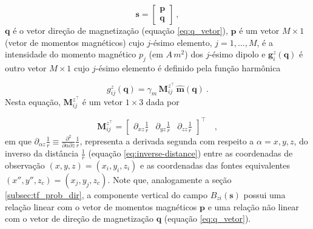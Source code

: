 \begin{equation}
      \mathbf{s} = \begin{bmatrix}
		\mathbf{p} \\
		\mathbf{q}
	\end{bmatrix} \: ,
	\label{eq:parameter-vector-z}
\end{equation}
$\mathbf{q}$ é o vetor direção de magnetização (equação \ref{eq:q_vetor}), $\mathbf{p}$ é um vetor $M \times 1$ (vetor de momentos magnéticos) cujo $j$-ésimo elemento, $j=1,\dots,M$, é a intensidade do momento magnético $p_{j}$ (em $A \, m^{2}$) dos $j$-ésimo dipolo e $\mathbf{g}_{i}^{z} (\mathbf{q})$ é outro vetor $M \times 1$ cujo $j$-ésimo elemento é definido pela função harmônica 

\begin{equation}
g_{ij}^{z}(\mathbf{q})  = \gamma_m \, \mathbf{M}_{ij}^{z^\top} \, \hat{\mathbf{m}}(\mathbf{q}) \: .
\label{eq:g_ij-z}
\end{equation}
Nesta equação, $\mathbf{M}_{ij}^{z^\top}$ é um vetor $1 \times 3$ dada por 

\begin{equation}
\mathbf{M}_{ij}^{z^\top} = \begin{bmatrix}
\partial_{xz} \frac{1}{r} & 
\partial_{yz} \frac{1}{r} &
\partial_{zz} \frac{1}{r}
\end{bmatrix}^\top \quad ,
\label{eq:Mij-matrix-z}
\end{equation}
em que $\partial_{\alpha z} \frac{1}{r} \equiv \frac{\partial^{2}}{\partial \alpha \partial z} \frac{1}{r}$, representa a derivada segunda com respeito a $\alpha = x, y, z$, do inverso da distância $\frac{1}{r}$ (equação \ref{eq:inverse-distance}) entre as coordenadas de observação $(x, y, z) = (x_{i}, y_{i}, z_{i})$ e as coordenadas das fontes equivalentes $(x'', y'', z_{c}) = (x_{j}, y_{j}, z_{c})$. Note que, analogamente a seção \ref{subsec:tf_prob_dir}, a componente vertical do campo $B_{zi}(\mathbf{s})$ possui uma relação linear com o vetor de momentos magnéticos $\mathbf{p}$ e uma relação não linear com o vetor de direção de magnetização $\mathbf{q}$ (equação \ref{eq:q_vetor}).

